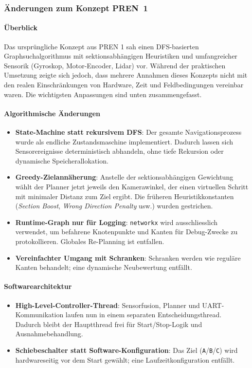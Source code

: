 \documentclass[main.tex]{subfiles} %
\begin{document}
\subsubsection{Änderungen zum Konzept \mbox{PREN 1}}

\paragraph{Überblick}
Das ursprüngliche Konzept aus PREN 1 sah einen DFS-basierten
Graphsuchalgorithmus mit sektionsabhängigen Heuristiken und umfangreicher
Sensorik (Gyroskop, Motor-Encoder, Lidar) vor.
Während der praktischen Umsetzung zeigte sich jedoch, dass mehrere Annahmen
dieses Konzepts nicht mit den realen Einschränkungen von Hardware, Zeit und
Feldbedingungen vereinbar waren.
Die wichtigsten Anpassungen sind unten zusammengefasst.

\paragraph{Algorithmische Änderungen}
\begin{itemize}
  \item \textbf{State-Machine statt rekursivem DFS}:
    Der gesamte Navigationsprozess wurde als endliche Zustandsmaschine
    implementiert.  Dadurch lassen sich Sensorereignisse deterministisch
    abhandeln, ohne tiefe Rekursion oder dynamische Speicherallokation.
  \item \textbf{Greedy-Zielannäherung}:
    Anstelle der sektionsabhängigen Gewichtung
    wählt der Planner jetzt jeweils den Kamerawinkel, der einen virtuellen
    Schritt mit minimaler Distanz zum Ziel ergibt.
    Die früheren Heuristikkonstanten
    (\emph{Section Boost}, \emph{Wrong Direction Penalty} usw.)
    wurden gestrichen.
  \item \textbf{Runtime-Graph nur für Logging}:
    \texttt{networkx} wird ausschliesslich verwendet, um befahrene
    Knotenpunkte und Kanten für Debug-Zwecke zu protokollieren.
    Globales Re-Planning ist entfallen.
  \item \textbf{Vereinfachter Umgang mit Schranken}:
    Schranken werden wie reguläre Kanten behandelt;
    eine dynamische Neubewertung entfällt.
\end{itemize}

\paragraph{Softwarearchitektur}
\begin{itemize}
  \item \textbf{High-Level-Controller-Thread}:
    Sensorfusion, Planner und UART-Kommunikation laufen nun in einem
    separaten Entscheidungsthread.  Dadurch bleibt der Hauptthread frei
    für Start/Stop-Logik und Ausnahmebehandlung.
  \item \textbf{Schiebeschalter statt Software-Konfiguration}:
    Das Ziel (\texttt{A}/\texttt{B}/\texttt{C}) wird hardwareseitig vor
    dem Start gewählt; eine Laufzeitkonfiguration entfällt.
\end{itemize}
\end{document}
